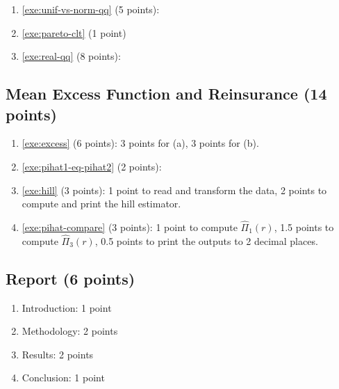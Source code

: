 \documentclass[12pt]{article}
\newcommand*{\Pihat}{\widehat{\Pi}}
\begin{document}
\begin{enumerate}
\item \cref{exe:unif-vs-norm-qq} (5 points):
\item \cref{exe:pareto-clt} (1 point)
\item \cref{exe:real-qq} (8 points):
\end{enumerate}

\subsection{Mean Excess Function and Reinsurance (14 points)}

\begin{enumerate}
\item \cref{exe:excess} (6 points):
    3 points for (a), 3 points for (b).
\item \cref{exe:pihat1-eq-pihat2} (2 points):
\item \cref{exe:hill} (3 points):
    1 point to read and transform the data,
    2 points to compute and print the hill estimator.
\item \cref{exe:pihat-compare} (3 points):
    1 point to compute $\Pihat_1(r)$,
    1.5 points to compute $\Pihat_3(r)$,
    0.5 points to print the outputs to 2 decimal places.
\end{enumerate}

\subsection{Report (6 points)}

\begin{enumerate}
\item Introduction: 1 point
\item Methodology: 2 points
\item Results: 2 points
\item Conclusion: 1 point
\end{enumerate}
\end{document}
